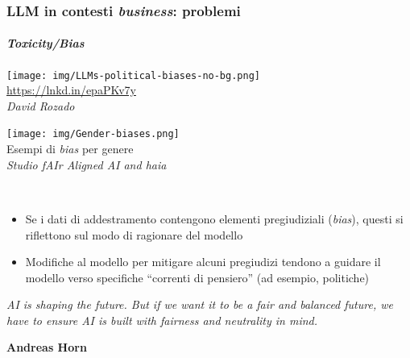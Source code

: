 \begin{frame}[t] \frametitle{LLM in contesti \emph{business}: problemi}
\framesubtitle{\emph{Toxicity/Bias}}
{\scriptsize
{}
    \begin{minipage}[t]{\textwidth}
        \begin{minipage}[t]{.49\textwidth}
            \centering
            \texttt{[image: img/LLMs-political-biases-no-bg.png]}
            {\tiny\\\url{https://lnkd.in/epaPKv7y}\\\vspace*{-1pt}\textit{\textcopyright David Rozado}}
        \end{minipage}
        \begin{minipage}[t]{.49\textwidth}
            \centering
            \texttt{[image: img/Gender-biases.png]}
            {\tiny\\Esempi di \textit{bias} per genere\\\vspace*{-1pt}\textit{\textcopyright Studio fAIr Aligned AI and haia}}
        \end{minipage}
    \end{minipage}
    \\\vspace*{.3cm}
    \begin{minipage}[t]{\textwidth}
        \begin{itemize}[leftmargin=10pt,align=right]
            \item[\alert{\faArrowCircleRight}] Se i dati di addestramento contengono elementi pregiudiziali (\emph{bias}), questi si riflettono sul modo di ragionare del modello
            \item[\alert{\faArrowCircleRight}] Modifiche al modello per mitigare alcuni pregiudizi tendono a guidare il modello verso specifiche ``correnti di pensiero'' (ad esempio, politiche)
        \end{itemize}
        \begin{minipage}[t]{\textwidth}
            \renewcommand{\epigraphsize}{\tiny}
            \setlength{\afterepigraphskip}{0pt}
            \setlength{\beforeepigraphskip}{5pt}
            \setlength{\epigraphwidth}{0.5\textwidth}
            \centering
            \epigraph{\textit{AI is shaping the future. But if we want it to be a fair and balanced future, we have to ensure AI is built with fairness and neutrality in mind.}}{\textbf{Andreas Horn}}
        \end{minipage}%
    \end{minipage}
}
\end{frame}
